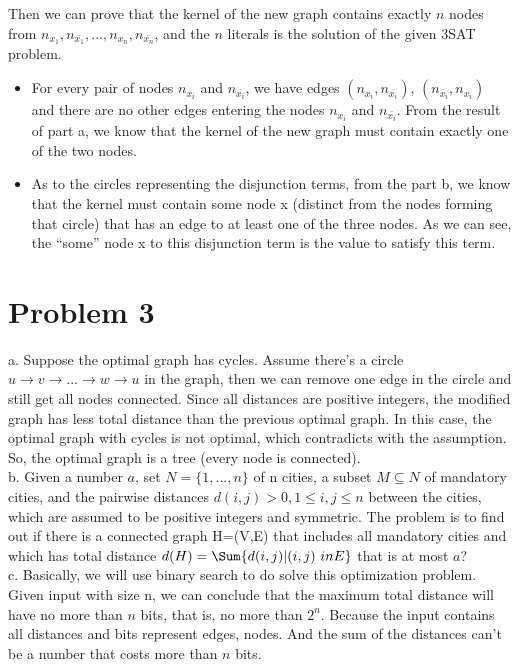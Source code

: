 \documentclass[12pt]{article}
\begin{document}
Then we can prove that the kernel of the new graph contains exactly $n$
nodes from $n_{x_1}, n_{\bar {x_1}}, ..., n_{x_n}, n_{\bar {x_n}}$,
and the $n$ literals is the solution of the given 3SAT problem.

\begin{itemize}
\item For every pair of nodes $n_{x_i}$ and $n_{\bar {x_i}}$, we have
  edges $(n_{x_i}, n_{\bar{x_i}})$, $(n_{\bar{x_i}}, n_{x_i})$ and
  there are no other edges entering the nodes $n_{x_i}$ and $n_{\bar
    {x_i}}$. From the result of part a, we know that the kernel of the
  new graph must contain exactly one of the two nodes.
\item As to the circles representing the disjunction terms, from the
  part b, we know that the kernel must contain some node x (distinct
  from the nodes forming that circle) that has an edge to at least one
  of the three nodes. As we can see, the ``some'' node x to this
  disjunction term is the value to satisfy this term.
\end{itemize}

\section*{Problem 3}

a. Suppose the optimal graph has cycles. Assume there's a circle $u
\to v \to ... \to w \to u$ in the graph, then we can remove one edge
in the circle and still get all nodes connected. Since all distances
are positive integers, the modified graph has less total distance
than the previous optimal graph. In this case, the optimal graph with
cycles is not optimal, which contradicts with the assumption. So, the
optimal graph is a tree (every node is connected). \\

b. Given a number $a$, set $N = \{1,...,n\}$ of n cities, a subset $M
\subseteq N$ of mandatory cities, and the pairwise distances
$d(i,j)>0, 1 \le i,j \le n$ between the cities, which are assumed to
be positive integers and symmetric. The problem is to find out if
there is a connected graph H=(V,E) that includes all mandatory cities
and which has total distance $d(H) = \Sum \{d(i,j)|(i,j) \ in
E \}$ that is at most $a$? \\

c. Basically, we will use binary search to do solve this optimization
problem. \\

Given input with size n, we can conclude that the maximum total
distance will have no more than $n$ bits, that is, no more than
$2^n$. Because the input contains all distances and bits represent
edges, nodes. And the sum of the distances can't be a number that
costs more than $n$ bits. \\
\end{document}
